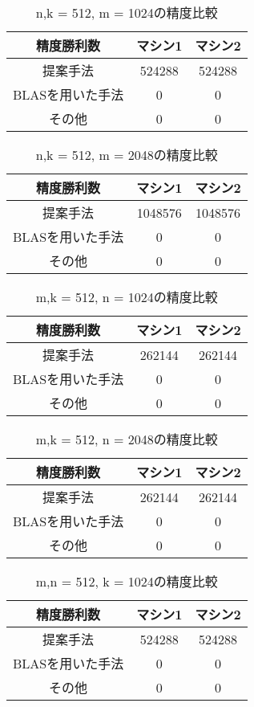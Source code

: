 \documentclass[11pt,a4paper]{jsreport}
\theoremstyle{definition}
\begin{document}
\begin{table}[H]
\centering
\small
\caption{n,k = 512, m = 1024の精度比較}
\begin{tabular}{c|c|c}
\hline
精度勝利数 & マシン1 & マシン2 \\ \hline \hline
提案手法 & 524288 & 524288 \\ \hline
BLASを用いた手法 & 0 & 0 \\ \hline
その他 & 0 & 0 \\ \hline
\end{tabular}
\end{table}

\begin{table}[H]
\centering
\small
\caption{n,k = 512, m = 2048の精度比較}
\begin{tabular}{c|c|c}
\hline
精度勝利数 & マシン1 & マシン2 \\ \hline \hline
提案手法 & 1048576 & 1048576 \\ \hline
BLASを用いた手法 & 0 & 0  \\ \hline
その他 & 0 & 0 \\ \hline
\end{tabular}
\end{table}

\begin{table}[H]
\centering
\small
\caption{m,k = 512, n = 1024の精度比較}
\begin{tabular}{c|c|c}
\hline
精度勝利数 & マシン1 & マシン2 \\ \hline \hline
提案手法 & 262144 & 262144 \\ \hline
BLASを用いた手法 & 0 & 0 \\ \hline
その他 & 0 & 0 \\ \hline
\end{tabular}
\end{table}

\begin{table}[H]
\centering
\small
\caption{m,k = 512, n = 2048の精度比較}
\begin{tabular}{c|c|c}
\hline
精度勝利数 & マシン1 & マシン2 \\ \hline \hline
提案手法 & 262144 & 262144 \\ \hline
BLASを用いた手法 & 0 & 0  \\ \hline
その他 & 0 & 0 \\ \hline
\end{tabular}
\end{table}

\begin{table}[H]
\centering
\small
\caption{m,n = 512, k = 1024の精度比較}
\begin{tabular}{c|c|c}
\hline
精度勝利数 & マシン1 & マシン2 \\ \hline \hline
提案手法 & 524288 & 524288 \\ \hline
BLASを用いた手法 & 0 & 0  \\ \hline
その他 & 0 & 0 \\ \hline
\end{tabular}
\end{table}
\end{document}
